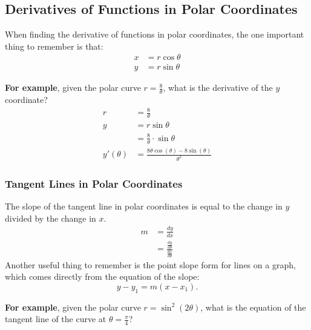 \documentclass[12pt]{article}
\begin{document}
        \subsection{Derivatives of Functions in Polar Coordinates}
            When finding the derivative of functions in polar coordinates, the one important thing to remember is that:
            \begin{align*}
                x &= r \cos \theta \\
                y &= r \sin \theta
            \end{align*}

            \noindent \textbf{For example}, given the polar curve $r=\frac{8}{\theta}$, what is the derivative of the $y$ coordinate?
            \begin{align*}
                r &= \frac{8}{\theta} \\[6pt]
                y &= r \sin \theta \\
                &= \frac{8}{\theta} \cdot \sin \theta \\[10pt]
                y'(\theta) &= \frac{8 \theta \cos(\theta) - 8 \sin(\theta)}{\theta^2}
            \end{align*}

            \subsubsection{Tangent Lines in Polar Coordinates}
                The slope of the tangent line in polar coordinates is equal to the change in $y$ divided by the change in $x$.
                \begin{align*}
                    m &= \frac{dy}{dx} \\[6pt]
                    &= \frac{\frac{dy}{d\theta}}{\frac{dx}{d\theta}}
                \end{align*}
                Another useful thing to remember is the point slope form for lines on a graph, which comes directly from the equation of the slope:
                \[ y - y_1 = m(x - x_1). \]

                \noindent \textbf{For example}, given the polar curve $r=\sin^2(2\theta)$, what is the equation of the tangent line of the curve at $\theta = \frac{\pi}{4}$?
\end{document}
